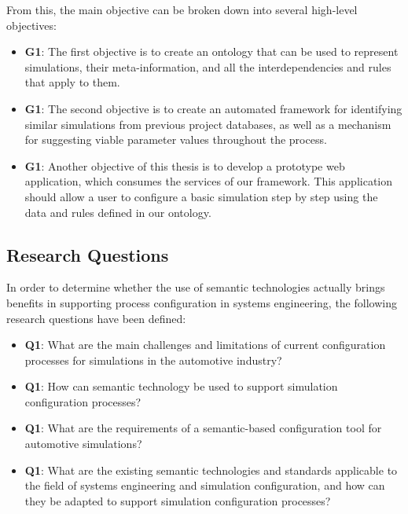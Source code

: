 From this, the main objective can be broken down into several high-level objectives:

\begin{itemize}
  \item \textbf{G1\label{G1}}: The first objective is to create an ontology that can be used to represent simulations, their meta-information, and all the interdependencies and rules that apply to them.

    \item \textbf{G1\label{G2}}: The second objective is to create an automated framework for identifying similar simulations from previous project databases, as well as a mechanism for suggesting viable parameter values throughout the process.
    
    \item \textbf{G1\label{G3}}: Another objective of this thesis is to develop a prototype web application, which consumes the services of our framework. This application should allow a user to configure a basic simulation step by step using the data and rules defined in our ontology.

\end{itemize}


\subsection{Research Questions\label{subsec:reseques}}

In order to determine whether the use of semantic technologies actually brings benefits in supporting process configuration in systems engineering, the following research questions have been defined: 

\begin{itemize}
  \item \textbf{Q1\label{Q1}}: What are the main challenges and limitations of current configuration processes for simulations in the automotive industry?
    \item \textbf{Q1\label{Q2}}: How can semantic technology be used to support simulation configuration processes?
    \item \textbf{Q1\label{Q3}}: What are the requirements of a semantic-based configuration tool for automotive simulations?
    \item \textbf{Q1\label{Q4}}: What are the existing semantic technologies and standards applicable to the field of systems engineering and simulation configuration, and how can they be adapted to support simulation configuration processes?
 \end{itemize}


